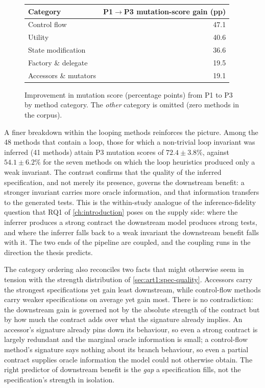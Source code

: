 \begin{figure}[ht]
\centering
\begin{tabular}{lr}
\toprule
\textbf{Category} & \textbf{P1$\rightarrow$P3 mutation-score gain (pp)} \\
\midrule
Control flow          & 47.1 \\
Utility               & 40.6 \\
State modification     & 36.6 \\
Factory \& delegate   & 19.5 \\
Accessors \& mutators & 19.1 \\
\bottomrule
\end{tabular}
\caption{Improvement in mutation score (percentage points) from P1 to P3 by method
category. The \emph{other} category is omitted (zero methods in the corpus).}
\label{fig:art1:improvement-by-category}
\end{figure}

A finer breakdown within the looping methods reinforces the picture. Among the 48
methods that contain a loop, those for which a non-trivial loop invariant was
inferred (41 methods) attain P3 mutation scores of $72.4 \pm 3.8\%$, against
$54.1 \pm 6.2\%$ for the seven methods on which the loop heuristics produced only a
weak invariant. The contrast confirms that the quality of the inferred
specification, and not merely its presence, governs the downstream benefit: a
stronger invariant carries more oracle information, and that information transfers
to the generated tests. This is the within-study analogue of the inference-fidelity
question that RQ1 of \cref{ch:introduction} poses on the supply side: where the
inferrer produces a strong contract the downstream model produces strong tests, and
where the inferrer falls back to a weak invariant the downstream benefit falls with
it. The two ends of the pipeline are coupled, and the coupling runs in the
direction the thesis predicts.

The category ordering also reconciles two facts that might otherwise seem in
tension with the strength distribution of \cref{sec:art1:spec-quality}. Accessors
carry the strongest specifications yet gain least downstream, while control-flow
methods carry weaker specifications on average yet gain most. There is no
contradiction: the downstream gain is governed not by the absolute strength of the
contract but by how much the contract adds over what the signature already implies.
An accessor's signature already pins down its behaviour, so even a strong contract
is largely redundant and the marginal oracle information is small; a control-flow
method's signature says nothing about its branch behaviour, so even a partial
contract supplies oracle information the model could not otherwise obtain. The
right predictor of downstream benefit is the \emph{gap} a specification fills, not
the specification's strength in isolation.

